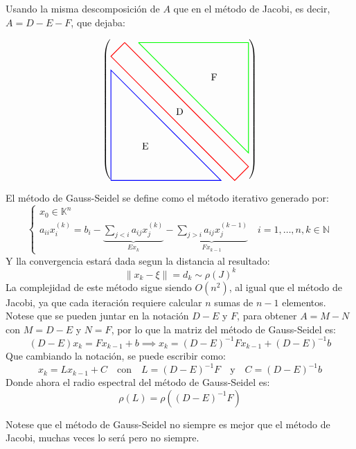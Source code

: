 \begin{teorema}
    Usando la misma descomposición de $A$ que en el método de Jacobi, es decir, $A = D - E - F$, que dejaba:
    \begin{center}
    \[
        \left(
        \begin{tikzpicture}[baseline=(current bounding box.center)]
            \draw[thick, green] (-1.5, 2.5) -- (2.5,2.5) -- (2.5,-1.5) -- (-1.5,2.5);
            \draw[thick, blue] (-2.5,-2.5) -- (-2.5,1.5) -- (1.5,-2.5) -- (-2.5,-2.5);
            \draw[thick, red] (-2, 2.5) -- (2.5, -2) -- (2, -2.5) -- (-2.5, 2) -- (-2, 2.5);
            \node at (0, 0) {D};
            \node at (-1.25, -1.25) {E};
            \node at (1.25, 1.25) {F};
        \end{tikzpicture}
        \right)
    \]
    \end{center}
    El método de Gauss-Seidel se define como el método iterativo generado por:
    \[
    \begin{cases}
        x_0 \in \mathbb{K}^n \\
        a_{ii} x_i^{(k)} =
        b_i - \underbrace{\sum_{j < i} a_{ij} x_j^{(k)}}_{Ex_k} - \underbrace{\sum_{j > i} a_{ij} x_j^{(k-1)}}_{Fx_{k-1}} \quad i = 1, \dots, n, k \in \mathbb{N}
    \end{cases}
    \]
    Y lla convergencia estará dada segun la distancia al resultado:
    \[
        \|x_k - \xi\| = d_k \sim \rho(J)^{k}
    \]
    La complejidad de este método sigue siendo $O(n^2)$, al igual que el método de Jacobi, ya que cada iteración requiere calcular $n$ sumas de $n-1$ elementos.\\
    Notese que se pueden juntar en la notación $D-E$ y $F$, para obtener $A = M - N$ con $M = D - E$ y $N = F$, por lo que la matriz del método de Gauss-Seidel es:
    \[
        (D-E) x_k = Fx_{k-1} + b \implies
        x_k = (D-E)^{-1} Fx_{k-1} + (D-E)^{-1} b
    \]
    Que cambiando la notación, se puede escribir como:
    \[
        x_k = Lx_{k-1} + C \quad \text{con} \quad
        L = (D-E)^{-1} F \quad \text{y} \quad
        C = (D-E)^{-1} b
    \]
    Donde ahora el radio espectral del método de Gauss-Seidel es:
    \[
        \rho(L) = \rho((D-E)^{-1} F)
    \]
\end{teorema}

Notese que el método de Gauss-Seidel no siempre es mejor que el método de Jacobi, muchas veces lo será pero no siempre.


